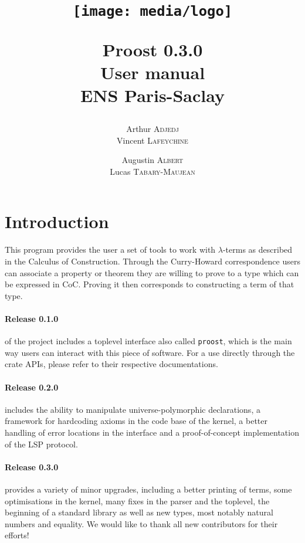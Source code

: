 \documentclass[twocolumn]{article}
\author{
  Arthur \textsc{Adjedj}\\
  Vincent \textsc{Lafeychine} \and
  Augustin \textsc{Albert} \\
  Lucas \textsc{Tabary-Maujean}
}
\title{
  \texttt{[image: media/logo]}

	\textbf{Proost 0.3.0} \\
	User manual
  \\[1\baselineskip]\normalsize ENS Paris-Saclay
}
\begin{document}
\maketitle
\thispagestyle{fancy}

\section{Introduction}
This program provides the user a set of tools to work with \(\lambda\)-terms as
described in the Calculus of Construction. Through the Curry-Howard
correspondence users can associate a property or theorem they are willing to
prove to a type which can be expressed in CoC. Proving it then corresponds to
constructing a term of that type.

\paragraph{Release 0.1.0} of the project includes a toplevel interface also called
\texttt{proost}, which is the main way users can interact with this piece of
software. For a use directly through the crate APIs, please refer to their
respective documentations.

\paragraph{Release 0.2.0} includes the ability to manipulate universe-polymorphic declarations, a
framework for hardcoding axioms in the code base of the kernel, a better handling
of error locations in the interface and a proof-of-concept implementation of the
LSP protocol.

\paragraph{Release 0.3.0} provides a variety of minor upgrades, including a better printing
of terms, some optimisations in the kernel, many fixes in the parser and the
toplevel, the beginning of a standard library as well as new types, most notably
natural numbers and equality. We would like to thank all new contributors for
their efforts!
\end{document}
